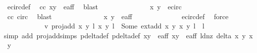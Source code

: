 \begin{isabellebody}
\ e{\isacharunderscore}circ{\isacharunderscore}def\ \isamarkupfalse%
\ cc\ {\isacartoucheopen}{\isacharparenleft}x{\isacharprime}{\isacharcomma}y{\isacharprime}{\isacharparenright}\ {\isasymin}\ e{\isacharunderscore}aff{\isacartoucheclose}\ \isamarkupfalse%
\ blast\isanewline
\ \ \ \ \ \ \ \ \ \ \isamarkupfalse%
\ \isamarkupfalse%
\ {\isachardoublequoteopen}{\isasymtau}\ {\isacharparenleft}x{\isacharprime}{\isacharcomma}\ y{\isacharprime}{\isacharparenright}\ {\isasymin}\ e{\isacharunderscore}circ{\isachardoublequoteclose}\ \isanewline
\ \ \ \ \ \ \ \ \ \ \ \ \isamarkupfalse%
\ cc\ {\isasymtau}{\isacharunderscore}circ\ \isamarkupfalse%
\ blast\isanewline
\ \ \ \ \ \ \ \ \ \ \isamarkupfalse%
\ \isamarkupfalse%
\ {\isachardoublequoteopen}{\isasymtau}\ {\isacharparenleft}x{\isacharprime}{\isacharcomma}\ y{\isacharprime}{\isacharparenright}\ {\isasymin}\ e{\isacharunderscore}aff{\isachardoublequoteclose}\isanewline
\ \ \ \ \ \ \ \ \ \ \ \ \isamarkupfalse%
\ e{\isacharunderscore}circ{\isacharunderscore}def\ \isamarkupfalse%
\ force\isanewline
\ \ \ \ \ \ \ \ \ \ \isamarkupfalse%
\ v{}{\isacharcolon}\ {\isachardoublequoteopen}proj{\isacharunderscore}add\ {\isacharparenleft}{\isacharparenleft}x{\isacharcomma}\ y{\isacharparenright}{\isacharcomma}\ l{\isacharparenright}\ {\isacharparenleft}{\isacharparenleft}x{\isacharprime}{\isacharcomma}\ y{\isacharprime}{\isacharparenright}{\isacharcomma}\ l{\isacharprime}{\isacharparenright}\ {\isacharequal}\ Some\ {\isacharparenleft}ext{\isacharunderscore}add\ {\isacharparenleft}x{\isacharcomma}\ y{\isacharparenright}\ {\isacharparenleft}x{\isacharprime}{\isacharcomma}\ y{\isacharprime}{\isacharparenright}{\isacharcomma}\ l\ {\isacharplus}\ l{\isacharprime}{\isacharparenright}{\isachardoublequoteclose}\isanewline
\ \ \ \ \ \ \ \ \ \ \ \ \isamarkupfalse%
{\isacharparenleft}simp\ add{\isacharcolon}\ proj{\isacharunderscore}add{\isachardot}simps\ p{\isacharunderscore}delta{\isacharprime}{\isacharunderscore}def\ p{\isacharunderscore}delta{\isacharunderscore}def\ {\isacartoucheopen}{\isacharparenleft}x{\isacharcomma}y{\isacharparenright}\ {\isasymin}\ e{\isacharunderscore}aff{\isacartoucheclose}\ {\isacartoucheopen}{\isacharparenleft}x{\isacharprime}{\isacharcomma}y{\isacharprime}{\isacharparenright}\ {\isasymin}\ e{\isacharunderscore}aff{\isacartoucheclose}\ ld{\isacharunderscore}nz\ {\isacartoucheopen}delta\ x\ y\ x{\isacharprime}\ y{\isacharprime}\ {\isacharequal}\ {}{\isacartoucheclose}{\isacharparenright}\ \isanewline

\end{isabellebody}
